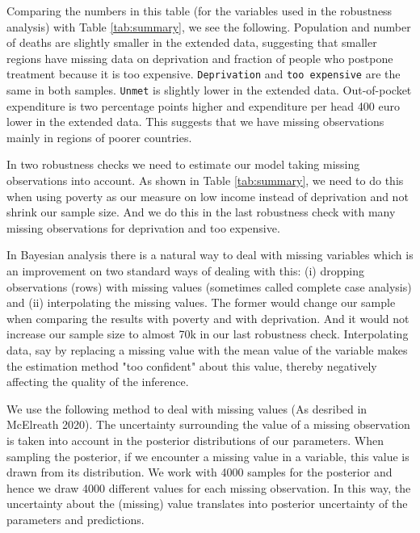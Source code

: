 \documentclass[a4paper,12pt]{article}
\makeatletter
\newcommand{\citeprocitem}[2]{\hyper@linkstart{cite}{citeproc_bib_item_#1}#2\hyper@linkend}
\makeatother
\begin{document}
Comparing the numbers in this table (for the variables used in the robustness analysis) with Table \ref{tab:summary}, we see the following. Population and number of deaths are slightly smaller in the extended data, suggesting that smaller regions have missing data on deprivation and fraction of people who postpone treatment because it is too expensive. \texttt{Deprivation} and \texttt{too expensive} are the same in both samples. \texttt{Unmet} is slightly lower in the extended data. Out-of-pocket expenditure is two percentage points higher and expenditure per head 400 euro lower in the extended data. This suggests that we have missing observations mainly in regions of poorer countries. 

In two robustness checks we need to estimate our model taking missing observations into account. As shown in Table \ref{tab:summary}, we need to do this when using poverty as our measure on low income instead of deprivation and not shrink our sample size. And we do this in the last robustness check with many missing observations for deprivation and too expensive.

In Bayesian analysis there is a natural way to deal with missing variables which is an improvement on two standard ways of dealing with this: (i) dropping observations (rows) with missing values (sometimes called complete case analysis) and (ii) interpolating the missing values. The former would change our sample when comparing the results with poverty and with deprivation. And it would not increase our sample size to almost 70k in our last robustness check. Interpolating data, say by replacing a missing value with the mean value of the variable makes the estimation method "too confident" about this value, thereby negatively affecting the quality of the inference.

We use the following method to deal with missing values (As desribed in \citeprocitem{18}{McElreath 2020}). The uncertainty surrounding the value of a missing observation is taken into account in the posterior distributions of our parameters. When sampling the posterior, if we encounter a missing value in a variable, this value is drawn from its distribution. We work with 4000 samples for the posterior and hence we draw 4000 different values for each missing observation. In this way, the uncertainty about the (missing) value translates into posterior uncertainty of the parameters and predictions.
\end{document}
